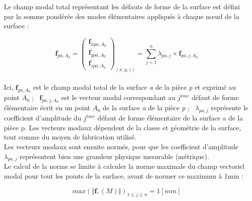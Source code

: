\documentclass[a4paper,10pt]{article}
\begin{document}
Le champ modal total représentant les défauts de forme de la surface est défini par la somme pondérée des modes élémentaires appliqués à chaque nœud de la surface :

\begin{equation}
\textbf{f}_{pa,A_{0}} = 
\begin{pmatrix}
\textbf{f}_{xpa,A_{0}} \\
\textbf{f}_{ypa,A_{0}} \\
\textbf{f}_{zpa,A_{0}} 
\end{pmatrix}_{(x,y,z)} = 
\sum_{j=1}^{n}\lambda_{pa,j}\times\textbf{f}_{pa,j,A_{0}}
\end{equation} \\


Ici, $ \textbf{f}_{pa,A_{0}} $ est le champ modal total de la surface \textit{a} de la pièce \textit{p} et exprimé au point $ \textit{A}_{0} $ ; \ $ \textbf{f}_{pa,j,A_{0}} $ est le vecteur modal correspondant au $j^{ème}$ défaut de forme élémentaire écrit en un point $\textit{A}_{0}$ de la surface \textit{a} de la pièce \textit{p} ; \ $\lambda_{pa,j}$ représente le coefficient d'amplitude du $j^{ème}$ défaut de forme élémentaire de la surface a de la pièce p. Les vecteurs modaux dépendent de la classe et géométrie de la surface, tout comme du moyen de fabrication utilisé. \\ 


Les vecteurs modaux sont ensuite normés, pour que les coefficient d'amplitude $\lambda_{pa,j}$ représentent bien une grandeur physique mesurable (métrique).\\
Le calcul de la norme se limite à calculer la norme maximale du champ vectoriel modal pour tout les points de la surface, avant de normer ce maximum à 1mm : 

\begin{equation}
max(\Vert\textbf{f},(M)\Vert)_{1\leq j\leq n} = 1[mm]
\end{equation}\\
\end{document}

